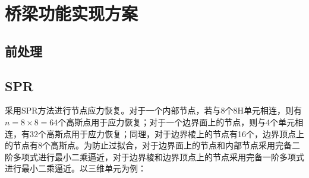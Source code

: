 \documentclass[UTF8]{ctexbook}
\begin{document}
\section{桥梁功能实现方案}
\subsection{前处理}

\subsection{SPR}

采用SPR方法进行节点应力恢复。对于一个内部节点，若与8个8H单元相连，则有$n=8\times8=64$个高斯点用于应力恢复；对于一个边界面上的节点，则与4个单元相连，有32个高斯点用于应力恢复；同理，对于边界棱上的节点有16个，边界顶点上的节点有8个高斯点。为防止过拟合，对于边界面上的节点和内部节点采用完备二阶多项式进行最小二乘逼近，对于边界棱和边界顶点上的节点采用完备一阶多项式进行最小二乘逼近。以三维单元为例：
\end{document}
